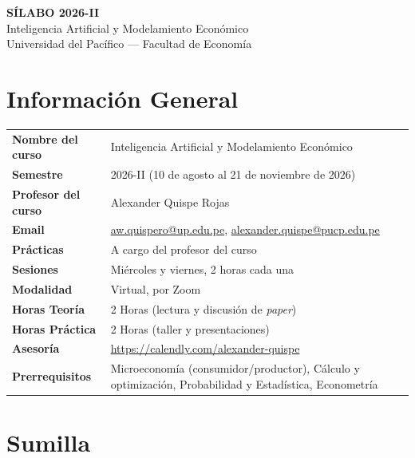 \documentclass[11pt]{article}
\begin{document}
\begin{center}
{\Large\bfseries S\'ILABO 2026-II}\\[0.4em]
{\large Inteligencia Artificial y Modelamiento Econ\'omico}\\[0.2em]
{\normalsize Universidad del Pac\'ifico --- Facultad de Econom\'ia}
\end{center}

\vspace{0.6em}

\section{Informaci\'on General}

\begin{tabular}{@{}p{4.2cm}p{11cm}@{}}
\textbf{Nombre del curso} & Inteligencia Artificial y Modelamiento Econ\'omico \\
\textbf{Semestre} & 2026-II (10 de agosto al 21 de noviembre de 2026) \\
\textbf{Profesor del curso} & Alexander Quispe Rojas \\
\textbf{Email} & \href{mailto:aw.quispero@up.edu.pe}{aw.quispero@up.edu.pe}, \href{mailto:alexander.quispe@pucp.edu.pe}{alexander.quispe@pucp.edu.pe} \\
\textbf{Pr\'acticas} & A cargo del profesor del curso \\
\textbf{Sesiones} & Mi\'ercoles y viernes, 2 horas cada una \\
\textbf{Modalidad} & Virtual, por Zoom \\
\textbf{Horas Teor\'ia} & 2 Horas (lectura y discusi\'on de \emph{paper}) \\
\textbf{Horas Pr\'actica} & 2 Horas (taller y presentaciones) \\
\textbf{Asesor\'ia} & \url{https://calendly.com/alexander-quispe} \\
\textbf{Prerrequisitos} & Microeconom\'ia (consumidor/productor), C\'alculo y optimizaci\'on, Probabilidad y Estad\'istica, Econometr\'ia \\
\end{tabular}

\section{Sumilla}
\end{document}
